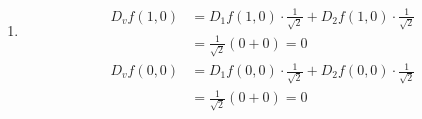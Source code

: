 \documentclass[a4paper,12pt]{article}
\begin{document}
\begin{enumerate}[label=\alph*)]
    $D_1 f$ ist also stetig in $0$.
    Mit der gleichen Argumentation ist $D_2 f$ stetig in $0$.
    Da also $D_1 f$ und $D_2 f$ stetig auf ganz $\mathbb{R}^2$ sind, ist $f$ nach Satz 3.6.4 total differenzierbar auf ganz $\mathbb{R}^2$.

    \item
    \begin{align*}
        D_v f(1,0)
        &= D_1 f(1,0) \cdot \frac{1}{\sqrt{2}} + D_2 f(1,0) \cdot \frac{1}{\sqrt{2}} \\
        &= \frac{1}{\sqrt{2}} (0 + 0) = 0
    \end{align*}
    \begin{align*}
        D_v f(0,0)
        &= D_1 f(0,0) \cdot \frac{1}{\sqrt{2}} + D_2 f(0,0) \cdot \frac{1}{\sqrt{2}} \\
        &= \frac{1}{\sqrt{2}} (0 + 0) = 0
    \end{align*}

\end{enumerate}
\end{document}
